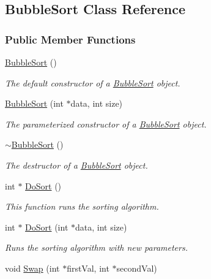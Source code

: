 \hypertarget{class_bubble_sort}{}\subsection{Bubble\+Sort Class Reference}
\label{class_bubble_sort}
\subsubsection*{Public Member Functions}
\begin{DoxyCompactItemize}
\item 
\hyperlink{class_bubble_sort_afc0a43f80902f95f071b31a91d7c6402}{Bubble\+Sort} ()
\begin{DoxyCompactList}\small\item\em The default constructor of a \hyperlink{class_bubble_sort}{Bubble\+Sort} object. \end{DoxyCompactList}\item 
\hyperlink{class_bubble_sort_a44175804bb38d86beb26a583177a1c4d}{Bubble\+Sort} (int $\ast$data, int size)
\begin{DoxyCompactList}\small\item\em The parameterized constructor of a \hyperlink{class_bubble_sort}{Bubble\+Sort} object. \end{DoxyCompactList}\item 
\hyperlink{class_bubble_sort_ac04244c2a98e23b093a24ffda60ae48a}{$\sim$\+Bubble\+Sort} ()
\begin{DoxyCompactList}\small\item\em The destructor of a \hyperlink{class_bubble_sort}{Bubble\+Sort} object. \end{DoxyCompactList}\item 
int $\ast$ \hyperlink{class_bubble_sort_a9864ef7b69bf5f620a973528e6dd0d2f}{Do\+Sort} ()
\begin{DoxyCompactList}\small\item\em This function runs the sorting algorithm. \end{DoxyCompactList}\item 
int $\ast$ \hyperlink{class_bubble_sort_a6b1113e0ebdf254cb22d5186dd854efe}{Do\+Sort} (int $\ast$data, int size)
\begin{DoxyCompactList}\small\item\em Runs the sorting algorithm with new parameters. \end{DoxyCompactList}\item 
void \hyperlink{class_bubble_sort_abbf5fb114b3244916da291b5dadb2f56}{Swap} (int $\ast$first\+Val, int $\ast$second\+Val)

\end{DoxyCompactItemize}
